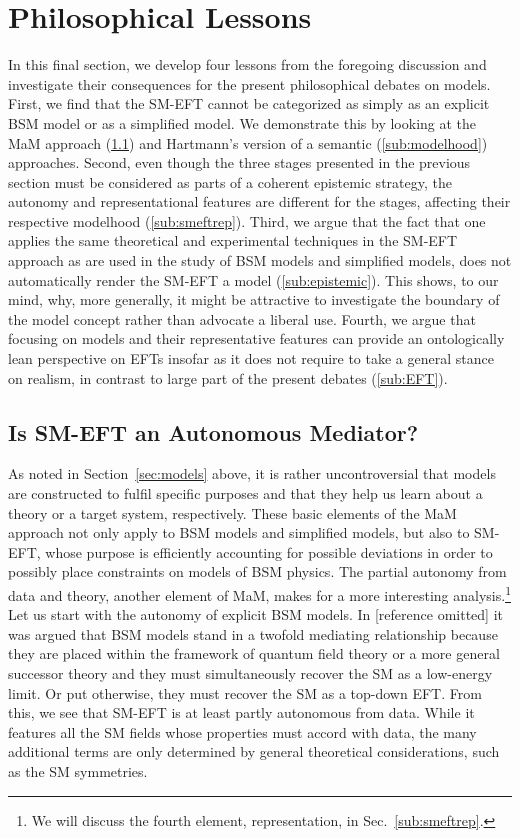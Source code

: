 \section{Philosophical Lessons}	%
\label{sec:analysis}


In this final section, we develop four lessons from the foregoing discussion and investigate their consequences for the present philosophical debates on models. 
First, we find that the SM-EFT cannot be categorized as simply as an explicit BSM model or as a simplified model. 
We demonstrate this by looking at the MaM approach (\ref{sub:autonomy}) and Hartmann's version of a semantic (\ref{sub:modelhood}) approaches. 
Second, even though the three stages presented in the previous section must be considered as parts of a coherent epistemic strategy, the autonomy and representational features are different for the stages, affecting their respective modelhood (\ref{sub:smeftrep}).
Third, we argue that the fact that one applies the same theoretical and experimental techniques in the SM-EFT approach as are used in the study of BSM models and simplified models, does not automatically render the SM-EFT a model (\ref{sub:epistemic}). 
This shows, to our mind, why, more generally, it might be attractive to investigate the boundary of the model concept rather than advocate a liberal use. 
Fourth, we argue that focusing on models and their representative features can provide an ontologically lean perspective on EFTs insofar as it does not require to take a general stance on realism, in contrast to large part of the present debates (\ref{sub:EFT}).


\subsection{Is SM-EFT an Autonomous Mediator?} %
\label{sub:autonomy}

As noted in Section~\ref{sec:models} above, it is rather uncontroversial that models are constructed to fulfil specific purposes and that they help us learn about a theory or a target system, respectively.
These basic elements of the MaM approach not only apply to BSM models and simplified models, but also to SM-EFT, whose purpose is efficiently accounting for possible deviations in order to possibly place constraints on models of BSM physics. 
The partial autonomy from data and theory, another element of MaM, makes for a more interesting analysis.\footnote{We will discuss the fourth element, representation, in Sec.~\ref{sub:smeftrep}.}
Let us start with the autonomy of explicit BSM models.
In [reference omitted] it was argued that BSM models stand in a twofold mediating relationship because they are placed within the framework of quantum field theory or a more general successor theory and they must simultaneously recover the SM as a low-energy limit. 
Or put otherwise, they must recover the SM as a top-down EFT.
From this, we see that SM-EFT is at least partly autonomous from data. While it features all the SM fields whose properties must accord with data, the many additional terms are only determined by general theoretical considerations, such as the SM symmetries.

